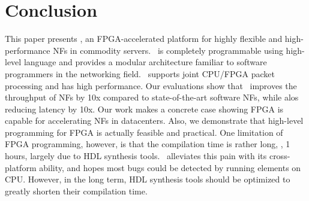 \section{Conclusion}
\label{clicknp:sec:conclusion}


This paper presents \name, an FPGA-accelerated platform for highly flexible 
and high-performance NFs in commodity servers.
\name\ is completely programmable using high-level language and provides a 
modular architecture familiar to software programmers in the networking field.
\name\ supports joint CPU/FPGA packet processing and has high performance.
Our evaluations show that \name\ improves the throughput of NFs by 10x compared to
state-of-the-art software NFs, while alos reducing latency by 10x.
%
Our work makes a concrete case showing FPGA is capable for accelerating NFs in datacenters.
Also, we demonstrate that high-level programming for FPGA is actually feasible and practical. 
%
One limitation of FPGA programming, however, is that the compilation time is rather long, \eg, 1 hours, largely
due to HDL synthesis tools.
\name\ alleviates this pain with its cross-platform ability, and hopes most bugs 
could be detected by running elements on CPU.
However, in the long term, HDL synthesis tools should be optimized to greatly 
shorten their compilation time.



